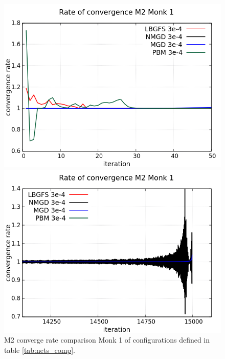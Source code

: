 \begin{figure}[H]
	\centering
	\begin{minipage}[t]{0.525\linewidth}		
		\includegraphics[width=\linewidth]{data/Comparison/Monk1/Monk1_M2_CR_zoomLeft.png}
	\end{minipage}%
	\begin{minipage}[t]{0.525\linewidth}
		\includegraphics[width=\linewidth]{data/Comparison/Monk1/Monk1_M2_CR_zoomRight.png}
	\end{minipage}
	\caption{M2 converge rate comparison Monk 1 of configurations defined in table \ref{tab:nets_comp}.}
	\label{fig:CR-M2-Monk1-Zoom}
\end{figure}

